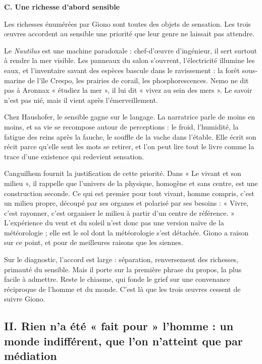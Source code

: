 \documentclass[11pt,a4paper]{article}
\begin{document}
\textbf{C. Une richesse d'abord sensible}

Les richesses énumérées par Giono sont toutes des objets de sensation. Les trois œuvres accordent au sensible une priorité que leur genre ne laissait pas attendre.

Le \emph{Nautilus} est une machine paradoxale : chef-d'œuvre d'ingénieur, il sert surtout à rendre la mer visible. Les panneaux du salon s'ouvrent, l'électricité illumine les eaux, et l'inventaire savant des espèces bascule dans le ravissement : la forêt sous-marine de l'île Crespo, les prairies de corail, les phosphorescences. Nemo ne dit pas à Aronnax « étudiez la mer », il lui dit « vivez au sein des mers ». Le savoir n'est pas nié, mais il vient après l'émerveillement.

Chez Haushofer, le sensible gagne sur le langage. La narratrice parle de moins en moins, et sa vie se recompose autour de perceptions : le froid, l'humidité, la fatigue des reins après la fauche, le souffle de la vache dans l'étable. Elle écrit son récit parce qu'elle sent les mots se retirer, et l'on peut lire tout le livre comme la trace d'une existence qui redevient sensation.

Canguilhem fournit la justification de cette priorité. Dans « Le vivant et son milieu », il rappelle que l'univers de la physique, homogène et sans centre, est une construction seconde. Ce qui est premier pour tout vivant, homme compris, c'est un milieu propre, découpé par ses organes et polarisé par ses besoins : « Vivre, c'est rayonner, c'est organiser le milieu à partir d'un centre de référence. » L'expérience du vent et du soleil n'est donc pas une version naïve de la météorologie ; elle est le sol dont la météorologie s'est détachée. Giono a raison sur ce point, et pour de meilleures raisons que les siennes.

Sur le diagnostic, l'accord est large : séparation, renversement des richesses, primauté du sensible. Mais il porte sur la première phrase du propos, la plus facile à admettre. Reste le chiasme, qui fonde le grief sur une convenance réciproque de l'homme et du monde. C'est là que les trois œuvres cessent de suivre Giono.

\hypertarget{ii.-rien-na-uxe9tuxe9-fait-pour-lhomme-un-monde-indiffuxe9rent-que-lon-natteint-que-par-muxe9diation}{%
\subsection{II. Rien n'a été « fait pour » l'homme : un monde indifférent, que l'on n'atteint que par médiation}\label{ii.-rien-na-uxe9tuxe9-fait-pour-lhomme-un-monde-indiffuxe9rent-que-lon-natteint-que-par-muxe9diation}}
\end{document}
